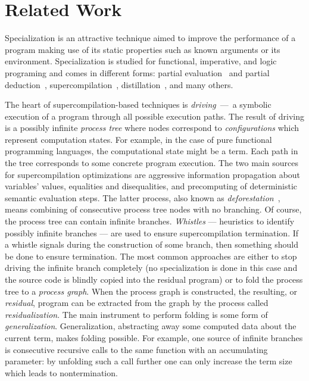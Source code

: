 \section{Related Work}

Specialization is an attractive technique aimed to improve the performance of a program making use of its static properties such as known arguments or its environment.
Specialization is studied for functional, imperative, and logic programing and comes in different forms: partial evaluation~\cite{jonesbook} and partial deduction~\cite{lloyd1991partial}, supercompilation~\cite{turchin1986concept, soerensen1996positive}, distillation~\cite{hamilton2007distillation}, and many others.


The heart of supercompilation-based techniques is \emph{driving}~---~a symbolic execution of a program through all possible execution paths.
The result of driving is a possibly infinite \emph{process tree} where nodes correspond to \emph{configurations} which represent computation states.
For example, in the case of pure functional programming languages, the computational state might be a term.
Each path in the tree corresponds to some concrete program execution.
The two main sources for supercompilation optimizations are aggressive information propagation about variables' values, equalities and disequalities, and precomputing of deterministic semantic evaluation steps.
The latter process, also known as \emph{deforestation}~\cite{deforestation}, means  combining of consecutive process tree nodes with no branching.
Of course, the process tree can contain infinite branches.
\emph{Whistles} --- heuristics to identify possibly infinite branches --- are used to ensure supercompilation termination.
If a whistle signals during the construction of some branch, then something should be done to ensure termination.
The most common approaches are either to stop driving the infinite branch completely (no specialization is done in this case and the source code is blindly copied into the residual program) or to fold the process tree to a \emph{process graph}.
When the process graph is constructed, the resulting, or \emph{residual}, program can be extracted from the graph by the process called \emph{residualization}.
The main instrument to perform folding is some form of \emph{generalization}.
Generalization, abstracting away some computed data about the current term, makes folding possible.
For example, one source of infinite branches is consecutive recursive calls to the same function with an accumulating parameter: by unfolding such a call further one can only increase the term size which leads to nontermination.
